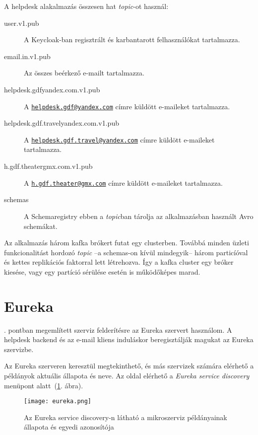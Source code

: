 A helpdesk alakalmazás összesen hat \textit{topic}-ot használ:
\begin{description}
	\item[user.v1.pub] A Keycloak-ban regisztrált és karbantarott felhasználókat tartalmazza.
	
	\item[email.in.v1.pub] Az összes beérkező  e-mailt tartalmazza.
	
	\item[helpdesk.gdf\textunderscore yandex.com.v1.pub] A  \href{mailto:helpdesk.gdf@yandex.com}{\nolinkurl{helpdesk.gdf@yandex.com}} címre küldött e-maileket tartalmazza.
	
	\item[helpdesk.gdf.travel\textunderscore yandex.com.v1.pub] A  \href{mailto:helpdesk.gdf.travel@yandex.com}{\nolinkurl{helpdesk.gdf.travel@yandex.com}} címre küldött e-maileket tartalmazza.
	
	
	\item[h.gdf.theater\textunderscore gmx.com.v1.pub] A \href{mailto:h.gdf.theater@gmx.com}{\nolinkurl{h.gdf.theater@gmx.com}} címre küldött e-maileket tartalmazza.
	
	\item[\textunderscore schemas] A Schemaregistry ebben a \textit{topic}ban tárolja az alkalmazásban használt Avro schemákat.
\end{description}


Az alkalmazás három kafka brókert futat egy clusterben. Továbbá minden üzleti funkcionalitást hordozó \textit{topic} --a \textunderscore schemas-on kívül mindegyik-- három particíóval és kettes replikációs faktorral lett létrehozva.
Így a kafka cluster egy bróker kiesése, vagy egy partíció sérülése esetén is működőképes marad.


\section{Eureka}
. pontban megemlített szerviz felderítésre az Eureka szervert használom. A helpdesk backend és az e-mail kliens induláskor beregisztálják magukat az Eureka szervizbe.

Az Eureka szerveren keresztül megtekinthető, és más szervizek számára elérhető a példányok aktuális állapota és neve. Az oldal elérhető a \textit{Eureka service discovery} menüpont alatt~(\ref{fig:eureka}. ábra).


\begin{figure}[hbt] 
	\centering
	\texttt{[image: eureka.png]}
	\caption[Az Eureka service discovery felülete]{Az Eureka service discovery-n látható a mikroszerviz példányainak állapota és egyedi azonosítója}
	\label{fig:eureka}
\end{figure}

